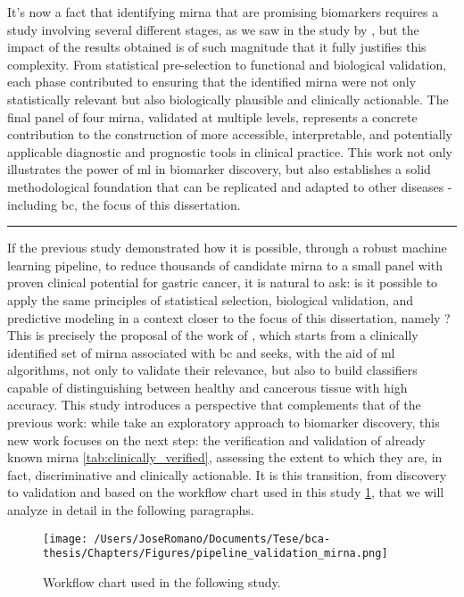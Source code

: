 It's now a fact that identifying \gls{mirna} that are promising biomarkers
requires a study involving several different stages, as we saw in the study by
\textcite{ml_gastric_Azari2023}, but the impact of the results obtained is of
such magnitude that it fully justifies this complexity. From statistical
pre-selection to functional and biological validation, each phase contributed
to ensuring that the identified \gls{mirna} were not only statistically
relevant but also biologically plausible and clinically actionable. The final
panel of four \gls{mirna}, validated at multiple levels, represents a concrete
contribution to the construction of more accessible, interpretable, and
potentially applicable diagnostic and prognostic tools in clinical practice.
This work not only illustrates the power of \gls{ml} in biomarker discovery,
but also establishes a solid methodological foundation that can be replicated
and adapted to other diseases - including \gls{bc}, the focus of this
dissertation.

\noindent\rule{\linewidth}{0.4pt}

If the previous study demonstrated how it is possible, through a robust machine
learning pipeline, to reduce thousands of candidate \gls{mirna} to a small
panel with proven clinical potential for gastric cancer, it is natural to ask:
is it possible to apply the same principles of statistical selection,
biological validation, and predictive modeling in a context closer to the focus
of this dissertation, namely ? This is precisely the proposal of
the work of \textcite{val_of_mirna_as_biomarker_Rehman_2019}, which starts from
a clinically identified set of \gls{mirna} associated with \gls{bc} and seeks,
with the aid of \gls{ml} algorithms, not only to validate their relevance, but
also to build classifiers capable of distinguishing between healthy and
cancerous tissue with high accuracy. This study introduces a perspective that
complements that of the previous work: while \textcite{ml_gastric_Azari2023}
take an exploratory approach to biomarker discovery, this new work focuses on
the next step: the verification and validation of already known \gls{mirna}
\ref{tab:clinically_verified}, assessing the extent to which they are, in fact,
discriminative and clinically actionable. It is this transition, from discovery
to validation and based on the workflow chart used in this study
\ref{fig:workflow_val}, that we will analyze in detail in the following
paragraphs.

\begin{figure}
  \centering
  \texttt{[image: /Users/JoseRomano/Documents/Tese/bca-thesis/Chapters/Figures/pipeline\_validation\_mirna.png]}
  \caption{Workflow chart used in the following study.}
  \label{fig:workflow_val}
\end{figure}


